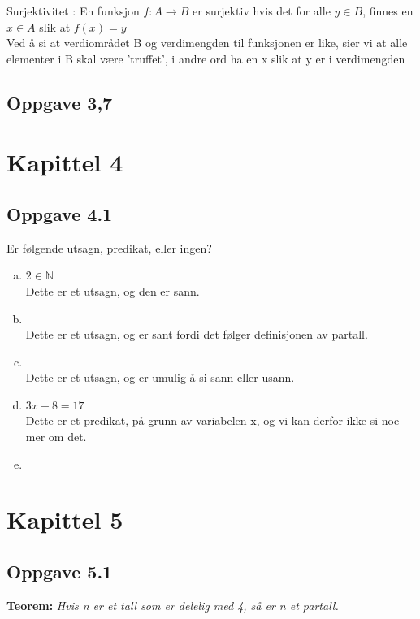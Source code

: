 \documentclass{article}
\begin{document}
Surjektivitet : En funksjon $f : A \rightarrow B$ er surjektiv hvis det for alle $y \in B$, finnes en $x \in A$ slik at $f(x) = y$
\\
Ved å si at verdiområdet B og verdimengden til funksjonen er like, sier vi at alle elementer i B skal være 'truffet', i andre ord ha en x slik at y er i verdimengden

\subsection*{Oppgave 3,7}
\newpage

\section*{Kapittel 4}

\subsection*{Oppgave 4.1}
Er følgende utsagn, predikat, eller ingen?

\begin{enumerate}[(a)]
    \item $2 \in \mathbb{N}$ \\ Dette er et utsagn, og den er sann.
    \item {} \\
    Dette er et utsagn, og er sant fordi det følger definisjonen av partall.
    \item {} \\
    Dette er et utsagn, og er umulig å si sann eller usann.
    \item $3x + 8 = 17$ \\
    Dette er et predikat, på grunn av variabelen x, og vi kan derfor ikke si noe mer om det.
    \item {} \\

\end{enumerate}

\section*{Kapittel 5}
\subsection*{Oppgave 5.1}
\textbf{Teorem:}
\textit{Hvis n er et tall som er delelig med 4, så er n et partall.} 
\end{document}
